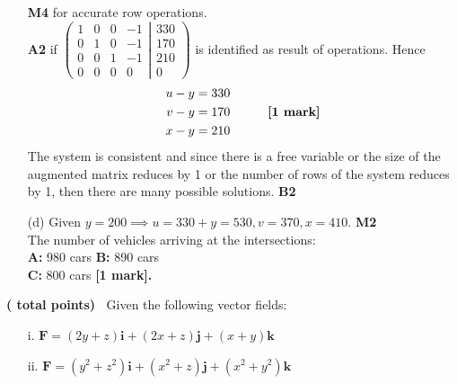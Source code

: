 \documentclass[12pt]{exam}
\newcommand{\vi}{\mathbf{i}}
\newcommand{\vj}{\mathbf{j}}
\newcommand{\vk}{\mathbf{k}}
\newcommand{\vF}{\mathbf{F}}
\begin{document}
\begin{questions}
\begin{solution}
\begin{enumerate}
		\textbf{M4} for accurate row operations.\\
		\textbf{A2} if $\left(
		\begin{matrix}
			1 & 0 & 0 & -1 \\
			0 & 1 & 0& -1 \\
			0 & 0 & 1 & -1\\
			0 & 0 & 0 & 0		
		\end{matrix}
		\left|
		\begin{matrix}
			330\\ 170 \\ 210 \\ 0
		\end{matrix} \right)\right.$  is identified as result of operations.
		Hence
		\begin{align*}
		u-y &=330\\
		v-y &=170\qquad\quad \text{\textbf{[1 mark]}}\\
		x-y &=210
		\end{align*}
		The system is consistent and since there is a free variable or the size of the augmented matrix reduces by 1  or the number of rows of the system reduces by 1, then there are many possible solutions. \hfill \textbf{B2}
		\item[(d)] Given $y=200 \implies u= 330+y = 530, v = 370, x = 410.$ \hfill \textbf{M2}\\
		The number of vehicles arriving at the intersections:\\
		\textbf{A:} 980 cars \quad \textbf{B:} 890 cars\\
		\textbf{C:} 800 cars \hfill\textbf{[1 mark].}
	\end{enumerate}
\end{solution}
\question
\textbf{( total points)} $\ $
Given the following vector fields:
\begin{enumerate}
	\item[i.]  $\vF = (2y+z)\vi + (2x+z)\vj + (x+y)\vk$
	\item[ii.] $\vF = (y^2 + z^2)\vi + (x^2 + z)\vj + (x^2+y^2)\vk$
\end{enumerate}
\end{questions}
\end{document}
